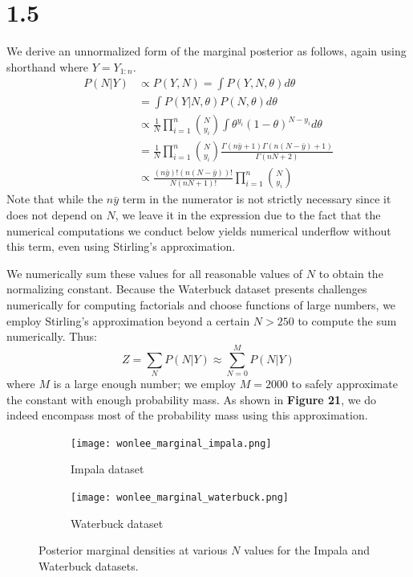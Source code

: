 \documentclass[10pt,psamsfonts]{amsart}
\theoremstyle{definition}
\theoremstyle{remark}
\numberwithin{equation}{section}
\begin{document}
\section*{1.5}

We derive an unnormalized form of the marginal posterior as follows, again using shorthand where $Y = Y_{1:n}$.
\begin{align*}
P(N|Y) &\propto P(Y, N) = \int P(Y,N,\theta)d\theta\\
&= \int P(Y|N,\theta) P(N,\theta)d\theta\\
&\propto \frac{1}{N} \prod_{i=1}^n {N\choose y_i} \int \theta^{y_i} (1-\theta)^{N-y_i}d\theta\\
&= \frac{1}{N} \prod_{i=1}^n {N\choose y_i} \frac{\Gamma(n\bar{y}+1)\Gamma(n(N-\bar{y})+1)}{\Gamma(nN+2)}\\
&\propto\frac{(n\bar{y})!(n(N-\bar{y}))!}{N(nN+1)!} \prod_{i=1}^n {N\choose y_i}
\end{align*}
Note that while the $n\bar{y}$ term in the numerator is not strictly necessary since it does not depend on $N$, we leave it in the expression due to the fact that the numerical computations we conduct below yields numerical underflow without this term, even using Stirling's approximation.

We numerically sum these values for all reasonable values of $N$ to obtain the normalizing constant. Because the Waterbuck dataset presents challenges numerically for computing factorials and choose functions of large numbers, we employ Stirling's approximation beyond a certain $N > 250$ to compute the sum numerically. Thus:
$$Z = \sum_{N} P(N|Y) \approx \sum_{N=0}^{M} P(N|Y)$$
where $M$ is a large enough number; we employ $M = 2000$ to safely approximate the constant with enough probability mass. As shown in {\bf Figure 21}, we do indeed encompass most of the probability mass using this approximation.

\begin{figure}
	\centering
	\begin{subfigure}[b]{0.45\textwidth}
		\texttt{[image: wonlee\_marginal\_impala.png]}
		\caption{Impala dataset}
	\end{subfigure}
	\begin{subfigure}[b]{0.45\textwidth}
		\texttt{[image: wonlee\_marginal\_waterbuck.png]}
		\caption{Waterbuck dataset}
	\end{subfigure}
	\caption{Posterior marginal densities at various $N$ values for the Impala and Waterbuck datasets.}
\end{figure}
\end{document}
